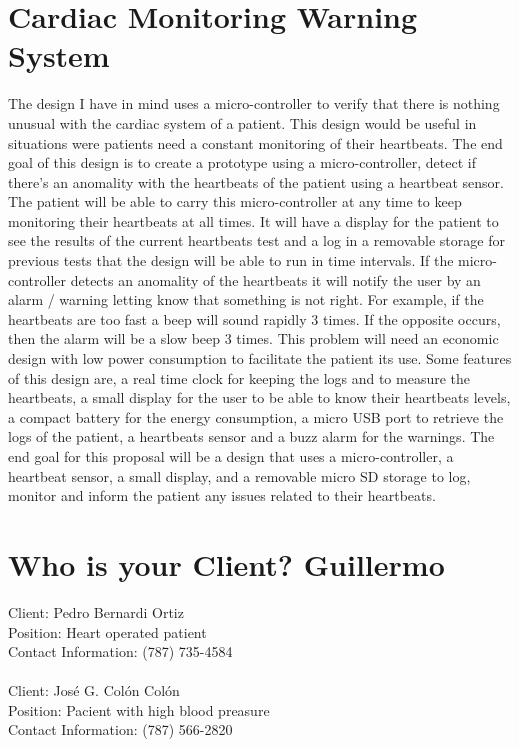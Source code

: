 \documentclass[12pt]{article}
\begin{document}
\section{Cardiac Monitoring Warning System}

The design I have in mind uses a micro-controller to verify that there is nothing unusual with the cardiac system of a patient. This design would be useful in situations were patients need a constant monitoring of their heartbeats. The end goal of this design is to create a prototype using a micro-controller, detect if there's an anomality with the heartbeats of the patient using a heartbeat sensor. The patient will be able to carry this micro-controller at any time to keep monitoring their heartbeats at all times. It will have a display for the patient to see the results of the current heartbeats test and a log in a removable storage for previous tests that the design will be able to run in time intervals. If the micro-controller detects an anomality of the heartbeats it will notify the user by an alarm / warning letting know that something is not right. For example, if the heartbeats are too fast a beep will sound rapidly 3 times. If the opposite occurs, then the alarm will be a slow beep 3 times. This problem will need an economic design with low power consumption to facilitate the patient its use. Some features of this design are, a real time clock for keeping the logs and to measure the heartbeats, a small display for the user to be able to know their heartbeats levels, a compact battery for the energy consumption, a micro USB port to retrieve the logs of the patient, a heartbeats sensor and a buzz alarm for the warnings. The end goal for this proposal will be a design that uses a micro-controller, a heartbeat sensor, a small display, and a removable micro SD storage to log, monitor and inform the patient any issues related to their heartbeats.


\newpage
\section{Who is your Client? Guillermo}
Client: Pedro Bernardi Ortiz\\
Position: Heart operated patient\\
Contact Information: (787) 735-4584\\
\\
Client: José G. Colón Colón\\
Position: Pacient with high blood preasure\\
Contact Information: (787) 566-2820\\
\end{document}
